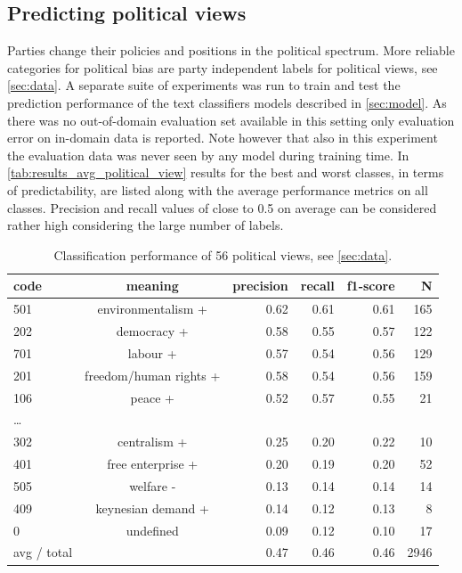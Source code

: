 \documentclass{article}
\begin{document}
\subsection{Predicting political views}
Parties change their policies and positions in the political spectrum. More reliable categories for political bias are party independent labels for political views, see \autoref{sec:data}. A separate suite of experiments was run to train and test the prediction performance of the text classifiers models described in \autoref{sec:model}. As there was no out-of-domain evaluation set available in this setting only evaluation error on in-domain data is reported. Note however that also in this experiment the evaluation data was never seen by any model during training time.
In \autoref{tab:results_avg_political_view} results for the best and worst classes, in terms of predictability, are listed along with the average performance metrics on all classes. 
Precision and recall values of close to 0.5 on average can be considered rather high considering the large number of labels. \\

\begin{table}[t]
\caption{
\label{tab:results_avg_political_view}
Classification performance of 56 political views, see \autoref{sec:data}.
}
\begin{center}
\begin{tabular}{lcrrrr}
code & meaning  &      precision    &recall &  f1-score  & N\\
\hline\hline
%
       501  & environmentalism + &      0.62   &   0.61 &     0.61  &     165\\
        202 &   democracy + &   0.58  &    0.55   &   0.57   &    122\\
        701    & labour +&  0.57  &    0.54   &   0.56      & 129\\
                201    &freedom/human rights +  & 0.58   &   0.54   &   0.56   &    159\\
         106   & peace + & 0.52&      0.57   &   0.55    &    21\\
\dots\\
        302     &centralism + & 0.25     & 0.20  &    0.22  &      10\\
        401    &  free enterprise + &0.20    &  0.19    &  0.20   &     52\\
        505    &welfare - &  0.13   &   0.14   &   0.14   &     14\\
        409    & keynesian demand +&  0.14  &    0.12  &    0.13   &      8\\
            0    & undefined &  0.09  &    0.12   &   0.10    &    17\\
            \hline
avg / total  &  &  0.47    &  0.46 &     0.46 &     2946\\
%
\end{tabular}
\end{center}
\end{table}
\end{document}
